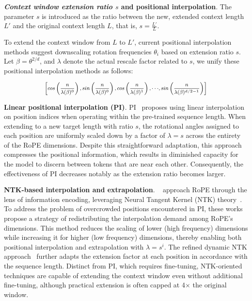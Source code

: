 \textbf{\emph{Context window extension ratio $s$} and positional interpolation}. The parameter $s$ is introduced as the ratio between the new, extended context length $L'$ and the original context length $L$, that is, $s=\frac{L'}{L}$.

To extend the context window from $L$ to $L'$, current positional interpolation methods suggest downscaling rotation frequencies $\theta_i$ based on extension ratio $s$. Let $\beta=\theta^{2/d}$, and $\lambda$ denote the actual rescale factor related to $s$, we   unify these positional interpolation methods as follows:

\begin{equation}	
	\fontsize{7.5}{7.5} \selectfont
	\label{eq:unified_rope}
	\begin{aligned}
		\left[cos\left(\frac{n}{\lambda(\beta)^0}\right), sin \left(\frac{n}{\lambda(\beta)^0}\right), cos\left(\frac{n}{\lambda(\beta)^1}\right), \cdot\cdot\cdot,  sin \left(\frac{n}{\lambda(\beta)^{d/2-1}}\right) \right]   
	\end{aligned}
\end{equation}

\textbf{Linear positional interpolation (PI)}. PI~\cite{pi} proposes using linear interpolation on position indices when operating within the pre-trained sequence length. When extending to a new target length with ratio $s$, the rotational angles assigned to each position are uniformly scaled down by a factor of $\lambda=s$ across the entirety of the RoPE dimensions. Despite this straightforward adaptation, this approach compresses the positional information, which results in diminished capacity for the model to discern between tokens that are near each other. Consequently, the effectiveness of PI decreases notably as the extension ratio becomes larger.

\textbf{NTK-based interpolation and extrapolation}. ~\cite{ntk,dynamicntk} approach RoPE through the lens of information encoding, leveraging Neural Tangent Kernel (NTK) theory~\cite{jacot2018neural,tancik2020fourier}. To address the problem of overcrowded positions encountered in PI, these works propose a strategy of redistributing the interpolation demand among RoPE’s dimensions. This method reduces the scaling of lower (high frequency) dimensions while increasing it for higher (low frequency) dimensions, thereby enabling both positional interpolation and extrapolation with $\lambda=s^{i}$. The refined dynamic NTK approach~\cite{dynamicntk} further adapts the extension factor at each position in accordance with the sequence length. Distinct from PI, which requires fine-tuning, NTK-oriented techniques are capable of extending the context window even without additional fine-tuning, although practical extension is often capped at 4$\times$ the original window.

